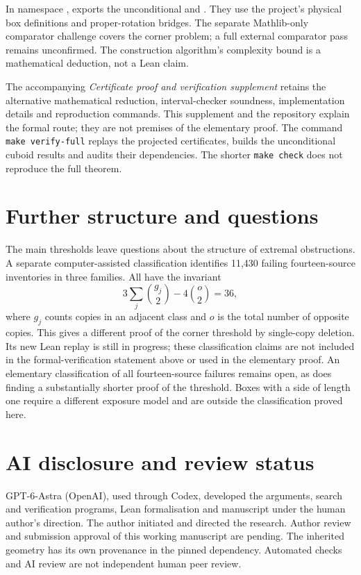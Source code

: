 \documentclass[11pt]{article}
\theoremstyle{remark}
\begin{document}
In namespace ,  exports the
unconditional  and .
They use the project's physical box definitions and proper-rotation bridges.
The separate Mathlib-only comparator challenge covers the corner problem;
a full external comparator pass remains unconfirmed. The construction
algorithm's complexity bound is a mathematical deduction, not a Lean claim.

The accompanying \emph{Certificate proof and verification supplement}
retains the alternative mathematical reduction, interval-checker soundness,
implementation details and reproduction commands. This supplement and the
repository explain the formal route; they are not premises of the elementary
proof. The command \texttt{make verify-full} replays the projected certificates,
builds the unconditional cuboid results and audits their dependencies. The
shorter \texttt{make check} does not reproduce the full theorem.

\section{Further structure and questions}
The main thresholds leave questions about the structure of extremal
obstructions. A separate computer-assisted classification identifies 11,430
failing fourteen-source inventories in three families. All have the invariant
\[
 3\sum_j\binom{g_j}{2}-4\binom{o}{2}=36,
\]
where $g_j$ counts copies in an adjacent class and $o$ is the total number
of opposite copies. This gives a different proof of the corner threshold
by single-copy deletion. Its new Lean replay is still in progress; these
classification claims are not included in the formal-verification statement
above or used in the elementary proof. An elementary classification of all
fourteen-source failures remains open, as does finding a substantially shorter
proof of the threshold. Boxes with a side of length one require a different
exposure model and are outside the classification proved here.

\section*{AI disclosure and review status}
GPT-6-Astra (OpenAI), used through Codex, developed the arguments, search and
verification programs, Lean formalisation and manuscript under the human
author's direction. The author initiated and directed the research. Author
review and submission approval of this working manuscript are pending.
The inherited geometry has its own provenance in the pinned dependency.
Automated checks and AI review are not independent human peer review.
\end{document}
